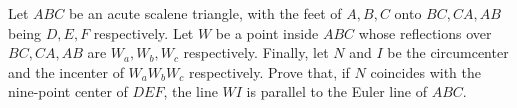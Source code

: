 Let $ABC$ be an acute scalene triangle, with the feet of $A,B,C$ onto $BC,CA,AB$ being $D,E,F$ respectively. Let $W$ be a point inside $ABC$ whose reflections over $BC,CA,AB$ are $W_a,W_b,W_c$ respectively. Finally, let $N$ and $I$ be the circumcenter and the incenter of $W_aW_bW_c$ respectively. Prove that, if $N$ coincides with the nine-point center of $DEF$,  the line $WI$ is parallel to the Euler line of $ABC$.